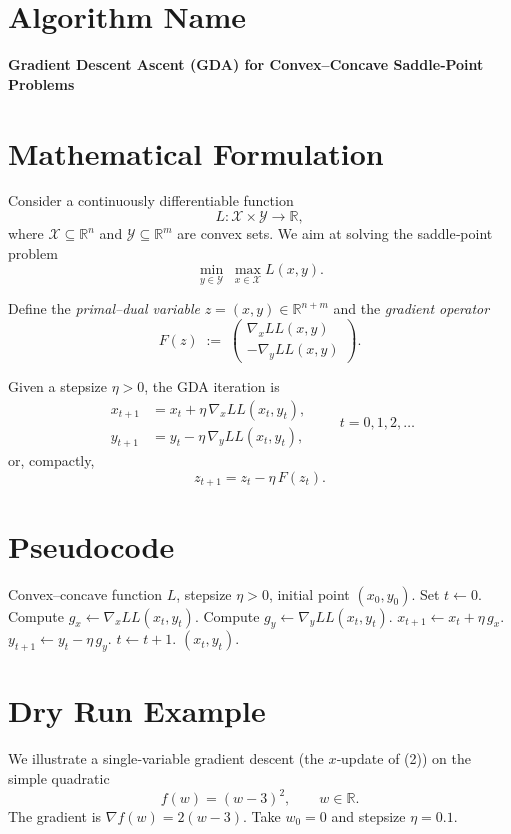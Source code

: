 \documentclass{article}
\newcommand{\gradx}{\nabla_{x} L}
\newcommand{\grady}{\nabla_{y} L}
\newcommand{\F}{F}
\newcommand{\z}{z}
\begin{document}
\section*{Algorithm Name}
\textbf{Gradient Descent Ascent (GDA) for Convex–Concave Saddle‑Point Problems}

\section*{Mathematical Formulation}
Consider a continuously differentiable function 
\[
L:\mathcal{X}\times\mathcal{Y}\rightarrow\mathbb{R},
\]
where $\mathcal{X}\subseteq\mathbb{R}^{n}$ and $\mathcal{Y}\subseteq\mathbb{R}^{m}$ are convex sets.  
We aim at solving the saddle‑point problem
\[
\min_{y\in\mathcal{Y}}\;\max_{x\in\mathcal{X}} L(x,y).
\]

Define the \emph{primal–dual variable} $\z=(x,y)\in\mathbb{R}^{n+m}$ and the \emph{gradient operator}
\[
\F(\z)\;:=\;\begin{pmatrix}
\gradx L(x,y)\\[2mm]
-\grady L(x,y)
\end{pmatrix}.
\tag{1}
\]

Given a stepsize $\eta>0$, the GDA iteration is
\[
\boxed{
\begin{aligned}
x_{t+1}&=x_{t}+\eta\,\gradx L(x_{t},y_{t}),\\
y_{t+1}&=y_{t}-\eta\,\grady L(x_{t},y_{t}),
\end{aligned}}
\qquad t=0,1,2,\dots
\tag{2}
\]
or, compactly,
\[
\z_{t+1}= \z_{t}-\eta\,\F(\z_{t}). \tag{3}
\]

\section*{Pseudocode}
\begin{algorithm}[H]
\caption{Gradient Descent Ascent (GDA)}
\begin{algorithmic}[1]
\Require Convex–concave function $L$, stepsize $\eta>0$, 
initial point $(x_{0},y_{0})$.
\State Set $t\gets 0$.
    \State Compute $g_x \gets \gradx L(x_t,y_t)$.
    \State Compute $g_y \gets \grady L(x_t,y_t)$.
    \State $x_{t+1}\gets x_t + \eta\, g_x$.
    \State $y_{t+1}\gets y_t - \eta\, g_y$.
    \State $t\gets t+1$.
\EndWhile
\State \Return $(x_{t},y_{t})$.
\end{algorithmic}
\end{algorithm}

\section*{Dry Run Example}
We illustrate a single‑variable gradient descent (the $x$‑update of (2)) on the simple quadratic
\[
f(w)=(w-3)^{2},\qquad w\in\mathbb{R}.
\]
The gradient is $\nabla f(w)=2(w-3)$.  
Take $w_{0}=0$ and stepsize $\eta=0.1$.
\end{document}
